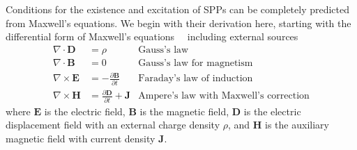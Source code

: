 Conditions for the existence and excitation of SPPs can be completely
predicted from Maxwell's equations.  We begin with their derivation here,
starting with the differential form of Maxwell's
equations~\cite{maier2007plasmonics}~\cite{benson2009elements} including
external sources
\begin{align}
\nabla \cdot \mathbf{D} &= \rho & \text{Gauss's law} \label{eqn:gausslaw}\\
\nabla \cdot \mathbf{B} &= 0 & \text{Gauss's law for magnetism} \label{eqn:gausslawmagnetism}\\
\nabla \times \mathbf{E} &= -\frac{\partial \mathbf{B}} {\partial t}
& \text{Faraday's law of induction} \label{eqn:faradayslaw} \\
\nabla \times \mathbf{H} &= \frac{\partial \mathbf{D}} {\partial
t} + \mathbf{J}  & \text{Ampere's law with Maxwell's correction}
\label{eqn:ampereslaw}
\end{align}
where $\mathbf{E}$ is the electric field, $\mathbf{B}$ is the magnetic
field, $\mathbf{D}$ is the electric displacement field with an external
charge density $\rho$, and $\mathbf{H}$ is the auxiliary magnetic field
with current density $\mathbf{J}$.

